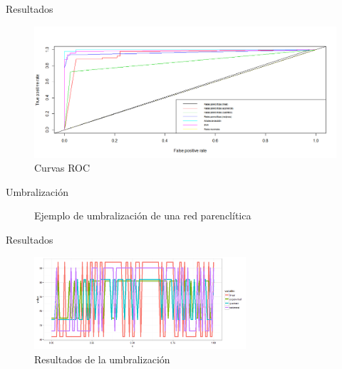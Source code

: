 \documentclass[hyperref={unicode}]{beamer}
\begin{document}
\begin{frame}{Resultados}
\begin{figure}
\begin{center}
			\includegraphics[width=\linewidth]{../memoria/imagenes/cancer/ROC_cancer.png}
		\end{center}
	\caption{Curvas ROC}
\end{figure}
\end{frame}

\begin{frame}{Umbralización}
	\begin{figure}[htbp!]
		\centering	
		\resizebox{!}{0.5\textwidth}{\ejemploumbralizacion}
		\caption{Ejemplo de umbralización de una red parenclítica}
		\label{fig:ejemploumbralizacion}
	\end{figure}
\end{frame}

\begin{frame}{Resultados}
	\begin{figure}[htbp!]
		\centering
		\includegraphics[width=0.7\textwidth]{../memoria/imagenes/cancer/umbralizacion.png}
		\caption{Resultados de la umbralización}		\label{fig:umbralizacion-resultados}
	\end{figure}
\end{frame}
\end{document}

